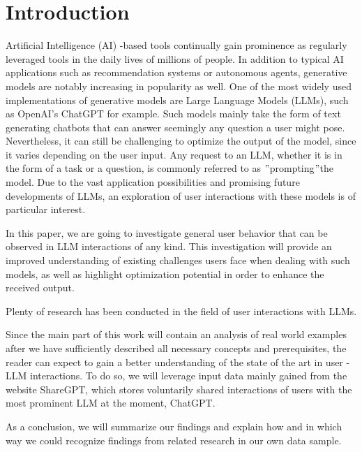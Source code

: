 
\section{Introduction}
\label{sec:introduction}

\sloppy %
Artificial Intelligence (AI) -based tools continually gain prominence as regularly leveraged tools in the
daily lives of millions of people.
In addition to typical AI applications such as recommendation systems or autonomous agents, generative
models are notably increasing in popularity as well.
One of the most widely used implementations of generative models are Large Language Models (LLMs),
such as OpenAI's ChatGPT for example.%
Such models mainly take the form of text generating chatbots that can answer seemingly any question
a user might pose.
Nevertheless, it can still be challenging to optimize the output of the model, since it varies depending
on the user input. %
Any request to an LLM, whether it is in the form of a task or a question, is commonly referred to as
\("\)prompting\("\)the model.
Due to the vast application possibilities and promising future developments of LLMs,
an exploration of user interactions with these models is of particular interest.

In this paper, we are going to investigate general user behavior that can be observed in LLM
interactions of any kind.
This investigation will provide an improved understanding of existing challenges users face when
dealing with such models, as well as highlight optimization potential in order to enhance the received
output.

Plenty of research has been conducted in the field of user interactions with LLMs.

Since the main part of this work will contain an analysis of real world examples after we have
sufficiently described all necessary concepts and prerequisites, the reader can expect to gain a better
understanding of the state of the art in user - LLM interactions.
To do so, we will leverage input data mainly gained from the website ShareGPT, %
which stores voluntarily shared interactions of users with the most prominent LLM at the moment,
ChatGPT. %

As a conclusion, we will summarize our findings and explain how and in which way we could recognize
findings from related research in our own data sample.